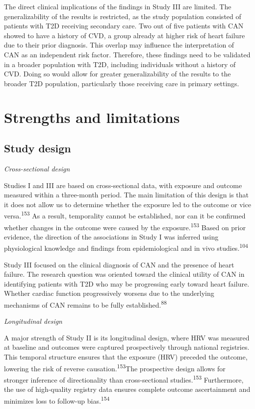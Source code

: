 \documentclass[
  a4paper,
  headsepline=true,
  open=left]{scrbook}
\begin{document}
The direct clinical implications of the findings in Study III are
limited. The generalizability of the results is restricted, as the study
population consisted of patients with T2D receiving secondary care. Two
out of five patients with CAN showed to have a history of CVD, a group
already at higher risk of heart failure due to their prior diagnosis.
This overlap may influence the interpretation of CAN as an independent
risk factor. Therefore, these findings need to be validated in a broader
population with T2D, including individuals without a history of CVD.
Doing so would allow for greater generalizability of the results to the
broader T2D population, particularly those receiving care in primary
settings.

\hypertarget{strengths-and-limitations}{%
\section{Strengths and limitations}\label{strengths-and-limitations}}

\hypertarget{study-design}{%
\subsection{Study design}\label{study-design}}

\emph{Cross-sectional design}

Studies I and III are based on cross-sectional data, with exposure and
outcome measured within a three-month period. The main limitation of
this design is that it does not allow us to determine whether the
exposure led to the outcome or vice versa.\textsuperscript{153} As a
result, temporality cannot be established, nor can it be confirmed
whether changes in the outcome were caused by the
exposure.\textsuperscript{153} Based on prior evidence, the direction of
the associations in Study I was inferred using physiological knowledge
and findings from epidemiological and in vivo
studies.\textsuperscript{104}

Study III focused on the clinical diagnosis of CAN and the presence of
heart failure. The research question was oriented toward the clinical
utility of CAN in identifying patients with T2D who may be progressing
early toward heart failure. Whether cardiac function progressively
worsens due to the underlying mechanisms of CAN remains to be fully
established.\textsuperscript{88}

\emph{Longitudinal design}

A major strength of Study II is its longitudinal design, where HRV was
measured at baseline and outcomes were captured prospectively through
national registries. This temporal structure ensures that the exposure
(HRV) preceded the outcome, lowering the risk of reverse
causation.\textsuperscript{153}The prospective design allows for
stronger inference of directionality than cross-sectional
studies.\textsuperscript{153} Furthermore, the use of high-quality
registry data ensures complete outcome ascertainment and minimizes loss
to follow-up bias.\textsuperscript{154}
\end{document}
